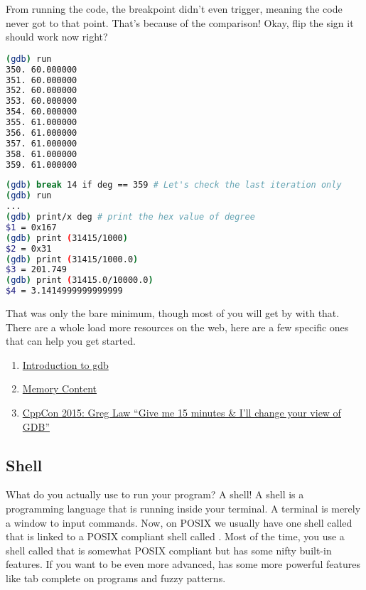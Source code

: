 From running the code, the breakpoint didn't even trigger, meaning the code never got to that point.
That’s because of the comparison!
Okay, flip the sign it should work now right?

\begin{lstlisting}[language=bash]
(gdb) run
350. 60.000000
351. 60.000000
352. 60.000000
353. 60.000000
354. 60.000000
355. 61.000000
356. 61.000000
357. 61.000000
358. 61.000000
359. 61.000000

\end{lstlisting}

\begin{lstlisting}[language=bash]
(gdb) break 14 if deg == 359 # Let's check the last iteration only
(gdb) run
...
(gdb) print/x deg # print the hex value of degree
$1 = 0x167
(gdb) print (31415/1000)
$2 = 0x31
(gdb) print (31415/1000.0)
$3 = 201.749
(gdb) print (31415.0/10000.0)
$4 = 3.1414999999999999

\end{lstlisting}

That was only the bare minimum, though most of you will get by with that.
There are a whole load more resources on the web, here are a few specific ones that can help you get started.

\begin{enumerate}
\item \href{http://www.cs.cmu.edu/~gilpin/tutorial/}{Introduction to gdb}
\item \href{http://www.delorie.com/gnu/docs/gdb/gdb\_56.html}{Memory Content}
\item \href{https://www.youtube.com/watch?v=PorfLSr3DDI}{CppCon 2015: Greg Law “Give me 15 minutes & I'll change your view of GDB”}
\end{enumerate}

\subsection{Shell}

What do you actually use to run your program? A shell! A shell is a programming language that is running inside your terminal. A terminal is merely a window to input commands. Now, on POSIX we usually have one shell called  that is linked to a POSIX compliant shell called . Most of the time, you use a shell called  that is somewhat POSIX compliant but has some nifty built-in features. If you want to be even more advanced,  has some more powerful features like tab complete on programs and fuzzy patterns.

